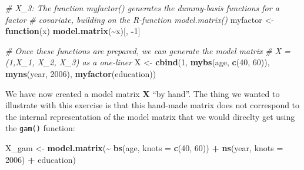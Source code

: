 \documentclass[
]{article}
\newenvironment{Shaded}{\begin{snugshade}}{\end{snugshade}}
\newcommand{\AttributeTok}[1]{\textcolor[rgb]{0.13,0.29,0.53}{#1}}
\newcommand{\CommentTok}[1]{\textcolor[rgb]{0.56,0.35,0.01}{\textit{#1}}}
\newcommand{\ControlFlowTok}[1]{\textcolor[rgb]{0.13,0.29,0.53}{\textbf{#1}}}
\newcommand{\DecValTok}[1]{\textcolor[rgb]{0.00,0.00,0.81}{#1}}
\newcommand{\FunctionTok}[1]{\textcolor[rgb]{0.13,0.29,0.53}{\textbf{#1}}}
\newcommand{\NormalTok}[1]{#1}
\newcommand{\OtherTok}[1]{\textcolor[rgb]{0.56,0.35,0.01}{#1}}
\newcommand{\SpecialCharTok}[1]{\textcolor[rgb]{0.81,0.36,0.00}{\textbf{#1}}}
\begin{document}
\begin{Shaded}
\begin{Highlighting}[]
\CommentTok{\# X\_3: The function myfactor() generates the dummy{-}basis functions for a factor}
\CommentTok{\# covariate, building on the R{-}function model.matrix()}
\NormalTok{myfactor }\OtherTok{\textless{}{-}} \ControlFlowTok{function}\NormalTok{(x) }\FunctionTok{model.matrix}\NormalTok{(}\SpecialCharTok{\textasciitilde{}}\NormalTok{x)[, }\SpecialCharTok{{-}}\DecValTok{1}\NormalTok{]}

\CommentTok{\# Once these functions are prepared, we can generate the model matrix}
\CommentTok{\# X = (1,X\_1, X\_2, X\_3) as a one{-}liner}
\NormalTok{X }\OtherTok{\textless{}{-}} \FunctionTok{cbind}\NormalTok{(}\DecValTok{1}\NormalTok{, }\FunctionTok{mybs}\NormalTok{(age, }\FunctionTok{c}\NormalTok{(}\DecValTok{40}\NormalTok{, }\DecValTok{60}\NormalTok{)), }\FunctionTok{myns}\NormalTok{(year, }\DecValTok{2006}\NormalTok{), }\FunctionTok{myfactor}\NormalTok{(education))}
\end{Highlighting}
\end{Shaded}

We have now created a model matrix \(\mathbf X\) ``by hand''. The thing
we wanted to illustrate with this exercise is that this hand-made matrix
does not correspond to the internal representation of the model matrix
that we would direclty get using the \texttt{gam()} function:

\begin{Shaded}
\begin{Highlighting}[]
\NormalTok{X\_gam }\OtherTok{\textless{}{-}} \FunctionTok{model.matrix}\NormalTok{(}\SpecialCharTok{\textasciitilde{}} \FunctionTok{bs}\NormalTok{(age, }\AttributeTok{knots =} \FunctionTok{c}\NormalTok{(}\DecValTok{40}\NormalTok{, }\DecValTok{60}\NormalTok{)) }\SpecialCharTok{+} \FunctionTok{ns}\NormalTok{(year, }\AttributeTok{knots =} \DecValTok{2006}\NormalTok{) }\SpecialCharTok{+}\NormalTok{ education)}
\end{Highlighting}
\end{Shaded}
\end{document}

